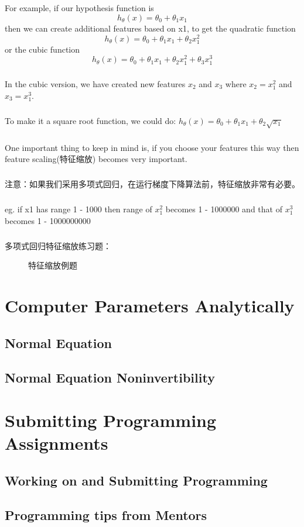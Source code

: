 \documentclass{article}
\begin{document}
\begin{CJK}{UTF8}{gbsn}
\subparagraph*{}
For example, if our hypothesis function is \begin{equation}
h_\theta(x)=\theta_0+\theta_1x_1
\end{equation}
then we can create additional features based on x1, to get the quadratic function \begin{equation}
h_\theta(x)=\theta_0+\theta_1x_1+\theta_2x_1^2
\end{equation} or the cubic function \begin{equation}
h_\theta(x)=\theta_0+\theta_1x_1+\theta_2x_1^2+\theta_3x_1^3
\end{equation}
\subparagraph*{}
In the cubic version, we have created new features $x_2$ and $x_3$ where $x_2=x_1^2$ and $x_3=x_1^3$.
\subparagraph*{}
To make it a square root function, we could do: $h_\theta(x)=\theta_0+\theta_1x_1+\theta_2\sqrt{x_1}$
\subparagraph*{}
One important thing to keep in mind is, if you choose your features this way then feature scaling(特征缩放) becomes very important.
\subparagraph*{}
注意：如果我们采用多项式回归，在运行梯度下降算法前，特征缩放非常有必要。
\subparagraph*{}
eg. if x1 has range 1 - 1000 then range of $x_1^2$ becomes 1 - 1000000 and that of $x_1^3$ becomes 1 - 1000000000
\subparagraph*{}
多项式回归特征缩放练习题：
\begin{figure}[H]
\caption{特征缩放例题}
\label{fig:230}
\end{figure}
\section{Computer Parameters Analytically}
\subsection{Normal Equation}

\subsection{Normal Equation Noninvertibility}

\section{Submitting Programming Assignments}

\subsection{Working on and Submitting  Programming}

\subsection{Programming tips from Mentors}

\end{CJK}
\end{document}
